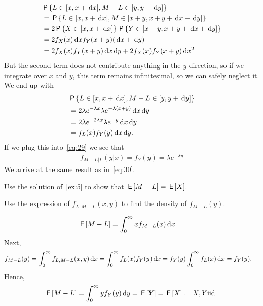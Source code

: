 \documentclass[a4paper,12pt]{article}
\begin{document}
\begin{exercise}
\begin{solution}
\begin{align}
  \label{eq:19}
&\,\mathsf{P}\left\{L\in[x, x+\,\textrm{d}x], M-L \in [y, y+\,\textrm{d}y]\right\}\\   
&= \,\mathsf{P}\left\{L\in[x, x+\,\textrm{d}x], M \in [x+y, x + y+ \,\textrm{d}x + \,\textrm{d}y]\right\}  \\
&= 2\,\mathsf{P}\left\{X\in[x, x+\,\textrm{d}x]\right\} \,\mathsf{P}\left\{Y \in [x+y, x + y+ \,\textrm{d}x +  \,\textrm{d}y]\right\}  \\
&= 2f_X(x) \,\textrm{d}x f_Y(x+y) (\,\textrm{d}x + \,\textrm{d}y) \\
&= 2f_X(x) f_Y(x+y) \,\textrm{d}x \,\textrm{d}y  + 2f_X(x)f_Y(x+y)\,\textrm{d}x^2
\end{align}
But the second term does not contribute anything in the $y$ direction, so if we integrate over $x$ and $y$, this  term remains  infinitesimal, so we can safely neglect it. We end up with
\begin{align}
&\,\mathsf{P}\left\{L\in[x, x+\,\textrm{d}x], M-L \in [y, y+\,\textrm{d}y]\right\}\\   
&= 2\lambda e^{-\lambda x} \lambda e^{-\lambda(x+y)} \,\textrm{d}x \,\textrm{d}y\\
&= 2\lambda e^{-2\lambda x} \lambda e^{-y} \,\textrm{d}x \,\textrm{d}y\\ 
&= f_L(x) f_Y(y) \,\textrm{d}x \,\textrm{d}y.\label{eq:30}
\end{align}
If we plug this into~\cref{eq:29} we see that
  \begin{align}
f_{M-L| L}(y| x) =  f_Y(y) = \lambda e^{-\lambda y}
  \end{align}
We arrive at  the same result as in~\cref{eq:30}. 

\end{solution}
\end{exercise}

\begin{exercise}
Use the solution of~\cref{ex:5} to show that $\,\mathsf{E}\left[M-L\right] = \,\mathsf{E}\left[X\right]$.
\begin{hint}
Use the expression of $f_{L, M-L}(x,y)$  to find the density of $f_{M-L}(y)$.
\end{hint}
\begin{solution}
  \begin{align}
\,\mathsf{E}\left[M-L\right] 
&= \int_{0}^{\infty} x f_{M-L}(x) \,\textrm{d}x.
  \end{align}
Next, 
\begin{align}
  \label{eq:32}
f_{M-L}(y) 
&= \int_0^\infty f_{L, M-L}(x, y) \,\textrm{d}x  = \int_0^\infty f_{L}(x) f_Y(y) \,\textrm{d}x = f_Y(y) \int_0^{\infty }f_L(x) \,\textrm{d}x = f_Y(y).
\end{align}
Hence, 
\begin{align}
  \label{eq:33}
  \,\mathsf{E}\left[M-L\right] = \int_0^{\infty} y f_Y(y) \,\textrm{d}y = \,\mathsf{E}\left[Y\right] = \,\mathsf{E}\left[X\right]. \quad X, Y \mathrm{iid.}\,
\end{align}

\end{solution}
\end{exercise}
\end{document}
